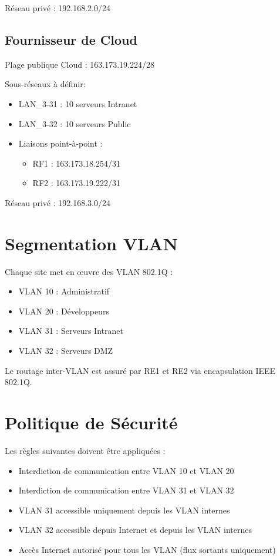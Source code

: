 \documentclass[11pt,a4paper]{article}
\begin{document}
	Réseau privé :  192.168.2.0/24
	
	\subsection{Fournisseur de Cloud}
	
	Plage publique Cloud : 163.173.19.224/28
	
	Sous-réseaux à définir:
	
	\begin{itemize}
		\item LAN\_3-31 : 10 serveurs Intranet
		\item LAN\_3-32 : 10 serveurs Public
		\item Liaisons point-à-point :
		\begin{itemize}
			\item RF1 : 163.173.18.254/31
			\item RF2 : 163.173.19.222/31
		\end{itemize}
	\end{itemize}

	Réseau privé :  192.168.3.0/24
	
	\section{Segmentation VLAN}
	
	Chaque site met en œuvre des VLAN 802.1Q :
	
	\begin{itemize}
		\item VLAN 10 : Administratif
		\item VLAN 20 : Développeurs
		\item VLAN 31 : Serveurs Intranet
		\item VLAN 32 : Serveurs DMZ
	\end{itemize}
	
	Le routage inter-VLAN est assuré par RE1 et RE2 via encapsulation IEEE 802.1Q.
	
	\section{Politique de Sécurité}
	
	Les règles suivantes doivent être appliquées :
	
	\begin{itemize}
		\item Interdiction de communication entre VLAN 10 et VLAN 20
		\item Interdiction de communication entre VLAN 31 et VLAN 32
		\item VLAN 31 accessible uniquement depuis les VLAN internes
		\item VLAN 32 accessible depuis Internet et depuis les VLAN internes
		\item Accès Internet autorisé pour tous les VLAN (flux sortants uniquement)		
	\end{itemize}
	
\end{document}
